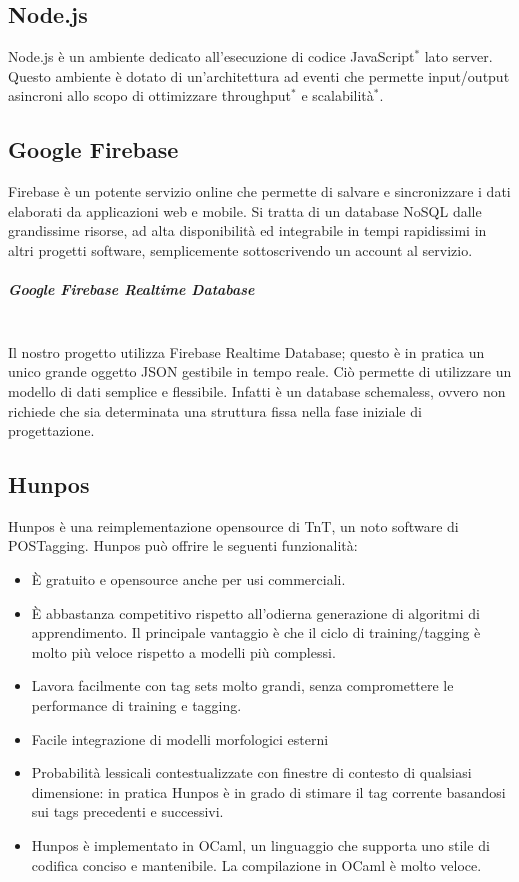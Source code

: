 \subsection{Node.js}
Node.js è un ambiente dedicato all'esecuzione di codice JavaScript$^*$ lato server. Questo ambiente è dotato di un'architettura ad eventi che permette input/output asincroni allo scopo di ottimizzare throughput$^*$ e scalabilità$^*$.
\subsection{Google Firebase}
Firebase è un potente servizio online che permette di salvare e sincronizzare i dati elaborati da applicazioni web e mobile. Si tratta di un database NoSQL dalle grandissime risorse, ad alta disponibilità ed integrabile in tempi rapidissimi in altri progetti software, semplicemente sottoscrivendo un account al servizio.

\subparagraph{Google Firebase Realtime Database}
 \noindent \\Il nostro progetto utilizza Firebase Realtime Database; questo è in pratica un unico grande oggetto JSON gestibile in tempo reale. Ciò permette di utilizzare un modello di dati semplice e flessibile. Infatti è un database schemaless, ovvero non richiede che sia determinata una struttura fissa nella fase iniziale di progettazione. 
\subsection{Hunpos}
Hunpos è una reimplementazione opensource di TnT, un noto software di POSTagging.
Hunpos può offrire le seguenti funzionalità:
\begin{itemize}
\item È gratuito e opensource anche per usi commerciali.

\item È abbastanza competitivo rispetto all'odierna generazione di algoritmi di apprendimento. Il principale vantaggio è che il ciclo di training/tagging è molto più veloce rispetto a modelli più complessi.

\item Lavora facilmente con tag sets molto grandi,
senza compromettere le performance di training e tagging.

\item Facile integrazione di modelli morfologici esterni

\item Probabilità lessicali contestualizzate con finestre di contesto di qualsiasi dimensione: in pratica Hunpos è in grado di stimare il tag corrente basandosi sui tags precedenti e successivi.

\item Hunpos è implementato in OCaml, un linguaggio che supporta uno stile di codifica conciso e mantenibile. La compilazione in OCaml è molto veloce.
\end{itemize}
